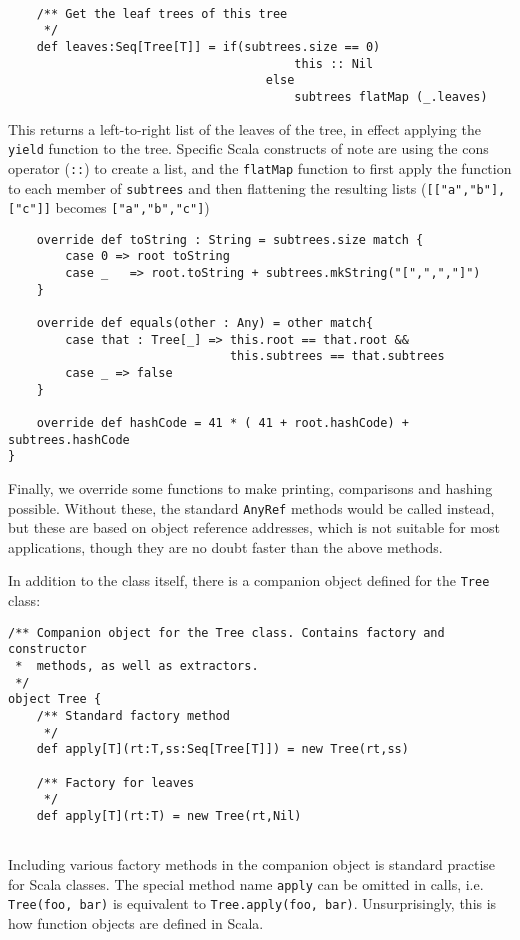 \begin{verbatim}
	
	/** Get the leaf trees of this tree
	 */
	def leaves:Seq[Tree[T]] = if(subtrees.size == 0)
										this :: Nil 
									else
										subtrees flatMap (_.leaves)
\end{verbatim}

This returns a left-to-right list of the leaves of the tree, in effect
applying the \texttt{yield} function to the tree. Specific Scala constructs
of note are using the cons operator (\texttt{::}) to create a list, and
the \texttt{flatMap} function to first apply the function to each member of
\texttt{subtrees} and then flattening the resulting lists
(\texttt{[["a","b"],["c"]]} becomes \texttt{["a","b","c"]})

\begin{verbatim}
	override def toString : String = subtrees.size match { 
		case 0 => root toString
		case _   => root.toString + subtrees.mkString("[",",","]") 
	}

	override def equals(other : Any) = other match{
		case that : Tree[_] => this.root == that.root &&
							   this.subtrees == that.subtrees
		case _ => false
	}

	override def hashCode = 41 * ( 41 + root.hashCode) + subtrees.hashCode
}
\end{verbatim}

Finally, we override some functions to make printing, comparisons and
hashing possible. Without these, the standard \texttt{AnyRef} methods would
be called instead, but these are based on object reference addresses, which
is not suitable for most applications, though they are no doubt faster than
the above methods. 

In addition to the class itself, there is a companion object defined for
the \texttt{Tree} class:
\begin{verbatim}
/** Companion object for the Tree class. Contains factory and constructor
 *  methods, as well as extractors.
 */
object Tree {
	/** Standard factory method
	 */
	def apply[T](rt:T,ss:Seq[Tree[T]]) = new Tree(rt,ss)
	
	/** Factory for leaves
	 */
	def apply[T](rt:T) = new Tree(rt,Nil)
	
\end{verbatim}

Including various factory methods in the companion object is standard
practise for Scala classes. The special method name \texttt{apply} can be
omitted in calls, i.e. \texttt{Tree(foo, bar)} is equivalent to
\texttt{Tree.apply(foo, bar)}. Unsurprisingly, this is how function objects
are defined in Scala. 

